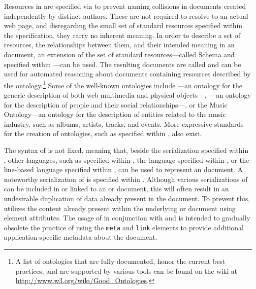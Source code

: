 \documentclass{book}
\begin{document}
Resources in  are specified via  to prevent naming
collisions in  documents created independently by distinct authors.
These  are not required to resolve to an actual web page, and
disregarding the small set of standard resources specified within the
 specification, they carry no inherent meaning. In order to
describe a set of resources, the relationships between them, and their intended
meaning in an  document, an extension of the set of standard
resources---called  Schema and specified within
\cite{brickley04}---can be used. The resulting documents are called
  and can be used for automated
reasoning about  documents containing resources described by the
ontology.\footnote{
  A list of ontologies that are fully documented, honor the current best
  practices, and are supported by various tools can be found on the
   wiki at \url{http://www.w3.org/wiki/Good_Ontologies}.
} Some of the well-known ontologies include ---an ontology for the
generic description of both web multimedia and physical objects---,
---an ontology for the description of people and their social
relationships---, or the Music Ontology---an ontology for the description of
entities related to the music industry, such as albums, artists, tracks, and
events. More expressive standards for the creation of ontologies, such as
 specified within \cite{mcguinness04}, also exist.

The syntax of  is not fixed, meaning that, beside the
 serialization specified within \cite{lassira99}, other
languages, such as  specified within \cite{sporny14}, the
 language specified within \cite{beckett14:turtle}, or the
line-based  language specified within \cite{beckett14:nt}, can be
used to represent an  document. A noteworthy serialization of
 is  specified within \cite{adida08}. Although
various serializations of  can be included in or linked to an
 or  document, this will often result in an
undesirable duplication of data already present in the document. To prevent
this,  utilizes the content already present within the underlying
 or  document using element attributes. The
usage of  in conjunction with  and  is
intended to gradually obsolete the practice of using the \texttt{meta} and
\texttt{link} elements to provide additional application-specific metadata about
the document.
\end{document}
